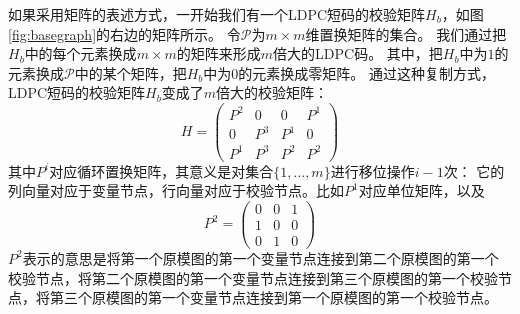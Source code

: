 如果采用矩阵的表述方式，一开始我们有一个LDPC短码的校验矩阵$H_b$，如图\ref{fig:basegraph}的右边的矩阵所示。
令$\mathcal{P}$为$m\times m$维置换矩阵的集合。
我们通过把$H_b$中的每个元素换成$m\times m$的矩阵来形成$m$倍大的LDPC码。
其中，把$H_b$中为$1$的元素换成$\mathcal{P}$中的某个矩阵，把$H_b$中为$0$的元素换成零矩阵。
通过这种复制方式，LDPC短码的校验矩阵$H_b$变成了$m$倍大的校验矩阵：
\begin{equation}
    H = \left(
      \begin{array}{cccc}
        P^2 & 0 & 0 & P^1 \\
        0 & P^3 & P^1 & 0 \\
        P^1 & P^3 & P^2 & P^2 
      \end{array} \right)
\end{equation}
其中$P^i$对应循环置换矩阵，其意义是对集合$\{1,\dots,m\}$进行移位操作$i-1$次：
它的列向量对应于变量节点，行向量对应于校验节点。比如$P^1$对应单位矩阵，以及
\begin{equation}
    P^2 = \left(
      \begin{array}{ccc}
        0 & 0 & 1 \\
        1 & 0 & 0 \\
        0 & 1 & 0
      \end{array} \right)
\end{equation}
$P^2$表示的意思是将第一个原模图的第一个变量节点连接到第二个原模图的第一个校验节点，将第二个原模图的第一个变量节点连接到第三个原模图的第一个校验节点，将第三个原模图的第一个变量节点连接到第一个原模图的第一个校验节点。
